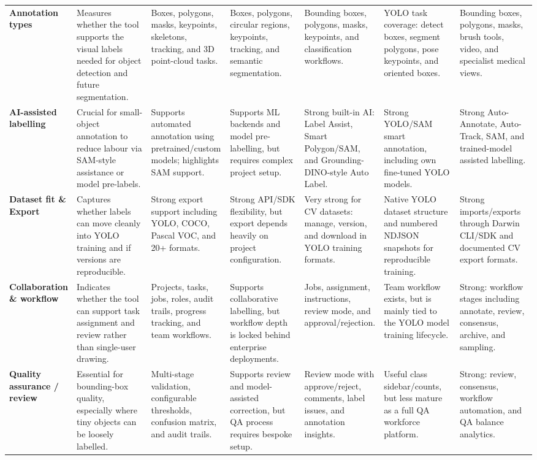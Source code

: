 \begin{landscape}
\begin{longtable}{@{}Y{0.10\linewidth}Y{0.15\linewidth}Y{0.15\linewidth}Y{0.15\linewidth}Y{0.15\linewidth}Y{0.15\linewidth}Y{0.15\linewidth}@{}}
\textbf{Annotation types} &
Measures whether the tool supports the visual labels needed for object detection and future segmentation. &
Boxes, polygons, masks, keypoints, skeletons, tracking, and 3D point-cloud tasks. &
Boxes, polygons, circular regions, keypoints, tracking, and semantic segmentation. &
Bounding boxes, polygons, masks, keypoints, and classification workflows. &
YOLO task coverage: detect boxes, segment polygons, pose keypoints, and oriented boxes. &
Bounding boxes, polygons, masks, brush tools, video, and specialist medical views. \\

\textbf{AI-assisted labelling} &
Crucial for small-object annotation to reduce labour via SAM-style assistance or model pre-labels. &
Supports automated annotation using pretrained/custom models; highlights SAM support. &
Supports ML backends and model pre-labelling, but requires complex project setup. &
Strong built-in AI: Label Assist, Smart Polygon/SAM, and Grounding-DINO-style Auto Label. &
Strong YOLO/SAM smart annotation, including own fine-tuned YOLO models. &
Strong Auto-Annotate, Auto-Track, SAM, and trained-model assisted labelling. \\

\textbf{Dataset fit \& Export} &
Captures whether labels can move cleanly into YOLO training and if versions are reproducible. &
Strong export support including YOLO, COCO, Pascal VOC, and 20+ formats. &
Strong API/SDK flexibility, but export depends heavily on project configuration. &
Very strong for CV datasets: manage, version, and download in YOLO training formats. &
Native YOLO dataset structure and numbered NDJSON snapshots for reproducible training. &
Strong imports/exports through Darwin CLI/SDK and documented CV export formats. \\

\textbf{Collaboration \& workflow} &
Indicates whether the tool can support task assignment and review rather than single-user drawing. &
Projects, tasks, jobs, roles, audit trails, progress tracking, and team workflows. &
Supports collaborative labelling, but workflow depth is locked behind enterprise deployments. &
Jobs, assignment, instructions, review mode, and approval/rejection. &
Team workflow exists, but is mainly tied to the YOLO model training lifecycle. &
Strong: workflow stages including annotate, review, consensus, archive, and sampling. \\

\textbf{Quality assurance / review} &
Essential for bounding-box quality, especially where tiny objects can be loosely labelled. &
Multi-stage validation, configurable thresholds, confusion matrix, and audit trails. &
Supports review and model-assisted correction, but QA process requires bespoke setup. &
Review mode with approve/reject, comments, label issues, and annotation insights. &
Useful class sidebar/counts, but less mature as a full QA workforce platform. &
Strong: review, consensus, workflow automation, and QA balance analytics. \\


\end{longtable}
\end{landscape}
